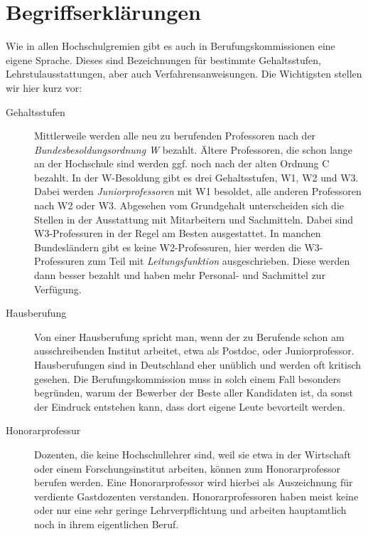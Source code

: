 \section{Begriffserklärungen}
Wie in allen Hochschulgremien gibt es auch in Berufungskommissionen eine eigene Sprache. Dieses sind Bezeichnungen für bestimmte Gehaltsstufen, Lehrstulausstattungen, aber auch Verfahrensanweisungen. Die Wichtigsten stellen wir hier kurz vor:
\begin{description}
    \item [Gehaltsstufen]%
          Mittlerweile werden alle neu zu berufenden Professoren nach der \emph{Bundesbesoldungsordnung W}
          bezahlt. Ältere Professoren, die schon lange an der Hochschule sind werden ggf. noch nach der alten
          Ordnung C bezahlt. In der W-Besoldung gibt es drei Gehaltsstufen, W1, W2 und W3. Dabei werden
          \emph{Juniorprofessoren} mit W1 besoldet, alle anderen Professoren nach W2 oder W3. Abgesehen vom Grundgehalt
          unterscheiden sich die Stellen in der Ausstattung mit Mitarbeitern und Sachmitteln. Dabei sind
          W3-Professuren in der Regel am Besten ausgestattet. In manchen Bundesländern gibt es keine
          W2-Professuren, hier werden die W3-Professuren zum Teil mit \emph{Leitungsfunktion} ausgeschrieben.
          Diese werden dann besser bezahlt und haben mehr Personal- und Sachmittel zur Verfügung.

    \item [Hausberufung]
          Von einer Hausberufung spricht man, wenn der zu Berufende schon am ausschreibenden Institut arbeitet,
          etwa als Postdoc, oder Juniorprofessor. Hausberufungen sind in Deutschland eher unüblich und werden
          oft kritisch gesehen. Die Berufungskommission muss in solch einem Fall besonders begründen, warum der Bewerber
          der Beste aller Kandidaten ist, da sonst der Eindruck entstehen kann, dass dort eigene Leute
          bevorteilt werden.

    \item [Honorarprofessur]
          Dozenten, die keine Hochschullehrer sind, weil sie etwa in der Wirtschaft oder einem Forschungsinstitut
          arbeiten, können zum Honorarprofessor berufen werden. Eine Honorarprofessor wird hierbei als Auszeichnung für
          verdiente Gastdozenten verstanden. Honorarprofessoren haben meist keine oder nur eine sehr geringe
          Lehrverpflichtung und arbeiten hauptamtlich noch in ihrem eigentlichen Beruf.


\end{description}
